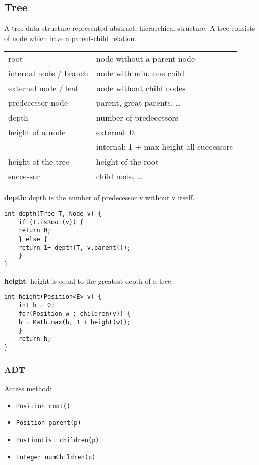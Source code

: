 \documentclass[11pt,twoside,landscape]{article}
\begin{document}
\begin{multicols}{2}
\subsection*{Tree}
\label{sec:org57d8498}
A tree data structure represented abstract, hierarchical structure. A tree consists of node which have a parent-child relation.

\begin{center}
\begin{tabular}{ll}
root & node without a parent node\\
internal node / branch & node with min. one child\\
external node / leaf & node without child nodes\\
predecessor node & parent, great parents, \ldots{}\\
depth & number of predecessors\\
height of a node & external: 0;\\
 & internal: 1 + max height all successors\\
height of the tree & height of the root\\
successor & child node, \ldots{}\\
\end{tabular}
\end{center}


\textbf{depth}: depth is the number of predecessor v without v itself. 
\begin{verbatim}
int depth(Tree T, Node v) {
    if (T.isRoot(v)) {
	return 0;
    } else {
	return 1+ depth(T, v.parent());
    }
}
\end{verbatim}

\textbf{height}: height is equal to the greatest depth of a tree.
\begin{verbatim}
int height(Position<E> v) {
    int h = 0;
    for(Position w : children(v)) {
	h = Math.max(h, 1 + height(w));
    }
    return h;
}

\end{verbatim}
\subsubsection*{ADT}
\label{sec:org4351c98}
Access method:
\begin{itemize}
\item \texttt{Position root()}
\item \texttt{Position parent(p)}
\item \texttt{PostionList children(p)}
\item \texttt{Integer numChildren(p)}
\end{itemize}


\end{multicols}
\end{document}
